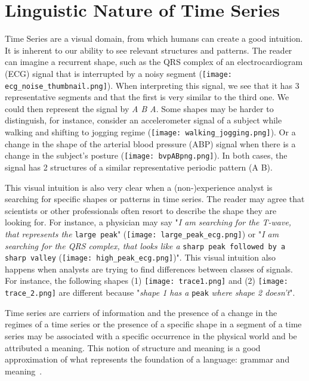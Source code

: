 \section{Linguistic Nature of Time Series}
\label{sub:context1}

Time Series are a visual domain, from which humans can create a good intuition. It is inherent to our ability to see relevant structures and patterns. The reader can imagine a recurrent shape, such as the \textcolor{myblue}{QRS complex} of an electrocardiogram (ECG) signal that is interrupted by a \textcolor{myred}{noisy} segment (\texttt{[image: ecg\_noise\_thumbnail.png]}). When interpreting this signal, we see that it has 3 representative segments and that the first is very similar to the third one. We could then represent the signal by \textit{\textcolor{myblue}{A} \textcolor{myred}{B} \textcolor{myblue}{A}}. Some shapes may be harder to distinguish, for instance, consider an accelerometer signal of a subject while \textcolor{myblue}{walking} and shifting to \textcolor{mygreen}{jogging} regime (\texttt{[image: walking\_jogging.png]}). Or a change in the shape of the arterial blood pressure (ABP) signal when there is a change in the subject's posture (\texttt{[image: bvpABpng.png]}). In both cases, the signal has 2 structures of a similar representative periodic pattern (\textcolor{myblue}{A} \textcolor{mygreen}{B}).

This visual intuition is also very clear when a (non-)experience analyst is searching for specific shapes or patterns in time series. The reader may agree that scientists or other professionals often resort to describe the shape they are looking for. For instance, a physician may say "\textit{I am searching for the T-wave, that represents the} \texttt{large peak}" (\texttt{[image: large\_peak\_ecg.png]}) or "\textit{I am searching for the QRS complex, that looks like a} \texttt{sharp peak followed by a sharp valley} (\texttt{[image: high\_peak\_ecg.png]})". This visual intuition also happens when analysts are trying to find differences between classes of signals. For instance, the following shapes (1) \texttt{[image: trace1.png]} and (2) \texttt{[image: trace\_2.png]} are different because "\textit{shape 1 has a} \texttt{peak} \textit{where shape 2 doesn't}". 

Time series are carriers of information and the presence of a change in the regimes of a time series or the presence of a specific shape in a segment of a time series may be associated with a specific occurrence in the physical world and be attributed a meaning. This notion of structure and meaning is a good approximation of what represents the foundation of a language: grammar and meaning~\cite{grammar}.

